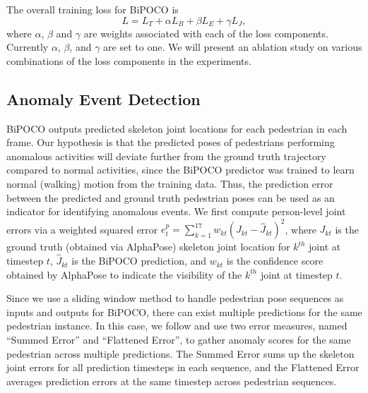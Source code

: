 \documentclass[nohyperref]{article}
\theoremstyle{plain}
\theoremstyle{definition}
\theoremstyle{remark}
\begin{document}
The overall training loss for BiPOCO is
\begin{equation}
\label{eqn:allloss}
L = L_{T} + \alpha L_{B} + \beta L_{E} + \gamma L_{J},
\end{equation}
where $\alpha$, $\beta$ and $\gamma$ are weights associated with each of the loss components. Currently $\alpha$, $\beta$, and $\gamma$ are set to one. We will present an ablation study on various combinations of the loss components in the experiments. 

\vspace{-3mm}

\subsection{Anomaly Event Detection}
\label{sec:anomaly}
\vspace{-2mm}
BiPOCO outputs predicted skeleton joint locations for each pedestrian in each frame. Our hypothesis is that the predicted poses of pedestrians performing anomalous activities will deviate further from the ground truth trajectory compared to normal activities, since the BiPOCO predictor was trained to learn normal (walking) motion from the training data. Thus, the prediction error between the predicted and ground truth pedestrian poses can be used as an indicator for identifying anomalous events. We first compute person-level joint errors via a weighted  squared error $e^p_{t} = \sum_{k=1}^{17} w_{kt} (J_{kt} - \hat{J}_{kt})^2$,
where $J_{kt}$ is the ground truth (obtained via AlphaPose) skeleton joint location for $k^{th}$ joint at timestep $t$, $\hat{J}_{kt}$ is the BiPOCO prediction, and  $w_{kt}$ is the confidence score obtained by AlphaPose to indicate the visibility of the $k^{th}$ joint  at timestep $t$. 

\vspace{-1mm}
Since we use a sliding window method to handle pedestrian pose sequences as inputs and outputs for BiPOCO, there can exist multiple predictions for the same pedestrian instance. In this case, we follow \cite{kanu2021leveraging} and use two error measures, named ``Summed Error'' and ``Flattened Error'', to gather anomaly scores for the same pedestrian across multiple predictions. The Summed Error sums up the skeleton joint errors for all prediction timesteps in each sequence, and the Flattened Error averages prediction errors at the same timestep across pedestrian sequences.
\vspace{-1mm}
\end{document}
